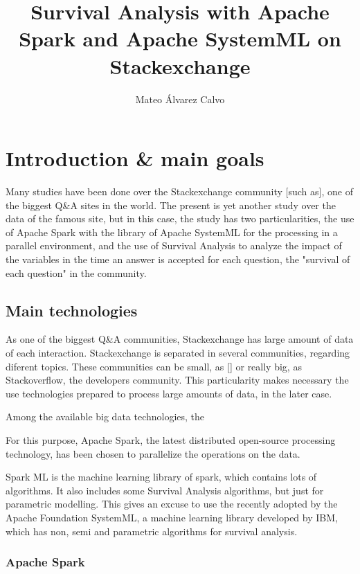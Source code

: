 \documentclass[11pt]{article} %
\title{Survival Analysis with Apache Spark and Apache SystemML on Stackexchange}
\author{Mateo Álvarez Calvo}
\begin{document}
\maketitle


\section{Introduction \& main goals}

Many studies have been done over the Stackexchange community [such as], one of the biggest Q\&A sites in the world. The present is yet another study over the data of the famous site, but in this case, the study has two particularities, the use of Apache Spark with the library of Apache SystemML for the processing in a parallel environment, and the use of Survival Analysis to analyze the impact of the variables in the time an answer is accepted for each question, the "survival of each question" in the community.

\subsection{Main technologies}

As one of the biggest Q\&A communities, Stackexchange has large amount of data of each interaction.
Stackexchange is separated in several communities, regarding diferent topics. These communities can be small, as [] or really big, as Stackoverflow, the developers community. This particularity makes necessary the use technologies prepared to process large amounts of data, in the later case.

Among the available big data technologies, the

For this purpose, Apache Spark, the latest distributed open-source processing technology, has been chosen to parallelize the operations on the data.

Spark ML is the machine learning library of spark, which contains lots of algorithms. It also includes some Survival Analysis algorithms, but just for parametric modelling. This gives an excuse to use the recently adopted by the Apache Foundation SystemML, a machine learning library developed by IBM, which has non, semi and parametric algorithms for survival analysis.


\subsubsection{Apache Spark}
\end{document}

